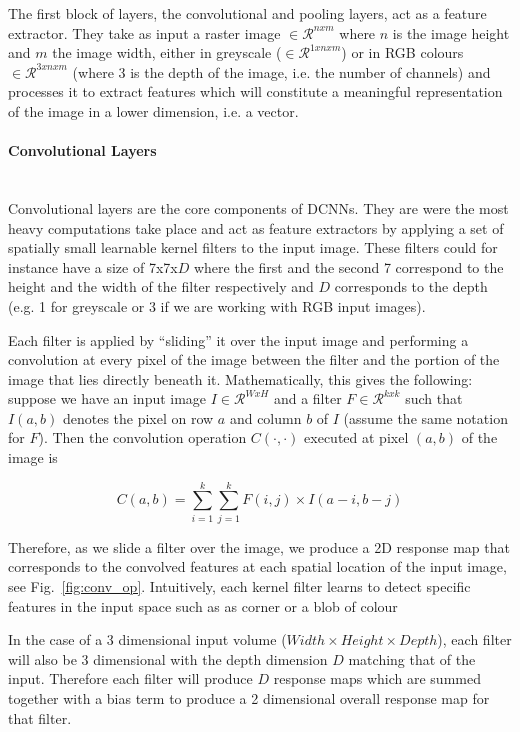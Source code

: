 \documentclass[12pt,twoside]{article}
\newcommand{\para}[1]{\paragraph{#1}\mbox{}\\}
\begin{document}
The first block of layers, the convolutional and pooling layers, act as a feature
extractor. They take as input a raster image $\in \mathcal{R}^{nxm}$ where 
$n$ is the image height and $m$ the image width, either in greyscale ($\in
\mathcal{R}^{1xnxm}$) or in RGB colours $\in \mathcal{R}^{3xnxm}$ 
(where 3 is the depth of the image, i.e. the number of channels) and
processes it to extract features which will constitute a meaningful
representation of the image in a lower dimension, i.e. a vector.

\para{Convolutional Layers}

Convolutional layers are the core components of DCNNs. They are were the most
heavy computations take place and act as feature extractors by applying a set
of spatially small learnable kernel filters to the input image. 
These filters could  for instance have a
size of 7x7x$D$ where the first and the second 7 correspond to the height and the
width of the filter respectively and $D$ corresponds to the depth (e.g. 1 for
greyscale or 3 if we are working with RGB input images).

Each filter is applied by ``sliding'' it over the input image and performing a
convolution at every pixel of the image between the filter and the portion of 
the image that lies directly beneath it. Mathematically, this gives the
following: suppose we have an input image $I \in \mathcal{R}^{WxH}$ and a
filter $F \in \mathcal{R}^{kxk}$ such that $I(a,b)$ denotes the pixel on row
$a$ and column $b$ of $I$ (assume the same notation for $F$). Then the convolution
operation  $C(\cdot,\cdot)$ executed at pixel $(a,b)$ of the image is

\begin{equation}
  C(a,b) = \sum_{i=1}^{k}\sum_{j=1}^{k} F(i,j) \times I(a-i, b-j)
  \label{eq:convolution}
\end{equation}

Therefore, as we slide a filter over the image, we produce a 2D response map
that corresponds to the convolved features at each spatial location of the
input image, see Fig.~\ref{fig:conv_op}. Intuitively, each kernel filter learns
to detect specific features in the input space such as as corner or a blob of colour

In the case of a 3 dimensional input volume ($Width \times Height \times Depth$), each filter will also be 3
dimensional with the depth dimension $D$ matching that of the input. Therefore each
filter will produce $D$ response maps which are summed together with a bias
term to produce a 2 dimensional overall response map for that filter.
\end{document}

